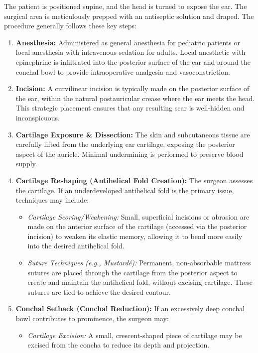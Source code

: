The patient is positioned supine, and the head is turned to expose the ear. The surgical area is meticulously prepped with an antiseptic solution and draped. The procedure generally follows these key steps:

\begin{enumerate}
  \item \textbf{Anesthesia:} Administered as general anesthesia for pediatric patients or local anesthesia with intravenous sedation for adults. Local anesthetic with epinephrine is infiltrated into the posterior surface of the ear and around the conchal bowl to provide intraoperative analgesia and vasoconstriction.
  \item \textbf{Incision:} A curvilinear incision is typically made on the posterior surface of the ear, within the natural postauricular crease where the ear meets the head. This strategic placement ensures that any resulting scar is well-hidden and inconspicuous.
  \item \textbf{Cartilage Exposure \& Dissection:} The skin and subcutaneous tissue are carefully lifted from the underlying ear cartilage, exposing the posterior aspect of the auricle. Minimal undermining is performed to preserve blood supply.
  \item \textbf{Cartilage Reshaping (Antihelical Fold Creation):} The surgeon assesses the cartilage. If an underdeveloped antihelical fold is the primary issue, techniques may include:
    \begin{itemize}
      \item \textit{Cartilage Scoring/Weakening:} Small, superficial incisions or abrasion are made on the anterior surface of the cartilage (accessed via the posterior incision) to weaken its elastic memory, allowing it to bend more easily into the desired antihelical fold.
      \item \textit{Suture Techniques (e.g., Mustard\'e):} Permanent, non-absorbable mattress sutures are placed through the cartilage from the posterior aspect to create and maintain the antihelical fold, without excising cartilage. These sutures are tied to achieve the desired contour.
    \end{itemize}
  \item \textbf{Conchal Setback (Conchal Reduction):} If an excessively deep conchal bowl contributes to prominence, the surgeon may:
    \begin{itemize}
      \item \textit{Cartilage Excision:} A small, crescent-shaped piece of cartilage may be excised from the concha to reduce its depth and projection.

\end{itemize}
\end{enumerate}
